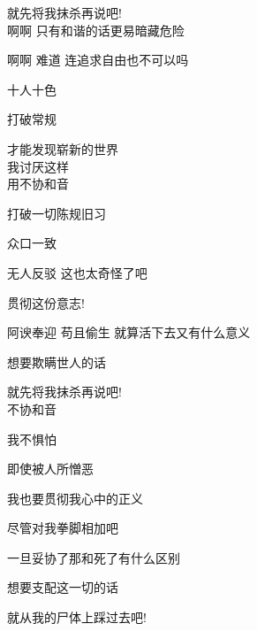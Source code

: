就先将我抹杀再说吧!
\\

啊啊 只有和谐的话更易暗藏危险

啊啊 难道 连追求自由也不可以吗

十人十色

打破常规

才能发现崭新的世界
\\

我讨厌这样
\\

用不协和音

打破一切陈规旧习

众口一致

无人反驳 这也太奇怪了吧

贯彻这份意志!

阿谀奉迎 苟且偷生 就算活下去又有什么意义

想要欺瞒世人的话

就先将我抹杀再说吧!
\\

不协和音

我不惧怕

即使被人所憎恶

我也要贯彻我心中的正义

尽管对我拳脚相加吧

一旦妥协了那和死了有什么区别

想要支配这一切的话

就从我的尸体上踩过去吧!
\\
